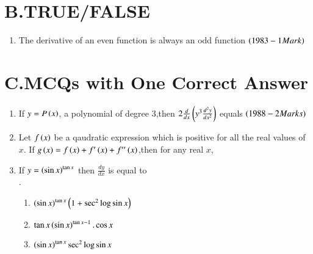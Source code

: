 \documentclass[journal,12pt,twocolumn]{IEEEtran}
\theoremstyle{remark}
\begin{document}
\section*{B.TRUE/FALSE}
\begin{enumerate}
    \item The derivative of an even function is always an odd function $\hfill\brak{1983-1 Mark}$
\end{enumerate}
\section*{C.MCQs with One Correct Answer}
\begin{enumerate}
    \item If $y=P\left(x\right)$, a polynomial of degree 3,then $2\frac{d}{dx}\left(y^3\frac{d^2y}{dx^2}\right)$ equals
    $\hfill\brak{1988-2 Marks}$
\begin{enumerate}[label=(\alph*)]
\end{enumerate}
\item Let $f\left(x\right)$ be a qaudratic expression which is positive for all the real values of $x$. If $g\left(x\right) = f\left(x\right)+f'\left(x\right)+f''\left(x\right)$,then for any real $x$,
\begin{enumerate}[label=(\alph*)]
\end{enumerate}
\item If $y=\left(\sin{x}\right)^{\tan{x}}$ then $\frac{dy}{dx}$ is equal to \\.\hfill{}
\begin{enumerate}[label=(\alph*)]
    \item $\left(\sin{x}\right)^{\tan{x}}\left(1+\sec^2{\log{\sin{x}}}\right)$
    \item $\tan{x}\left(\sin{x}\right)^{\tan{x}-1}.\cos{x}$
    \item $\left(\sin{x}\right)^{\tan{x}}\sec^2{\log{\sin{x}}}$

\end{enumerate}
\end{enumerate}
\end{document}
